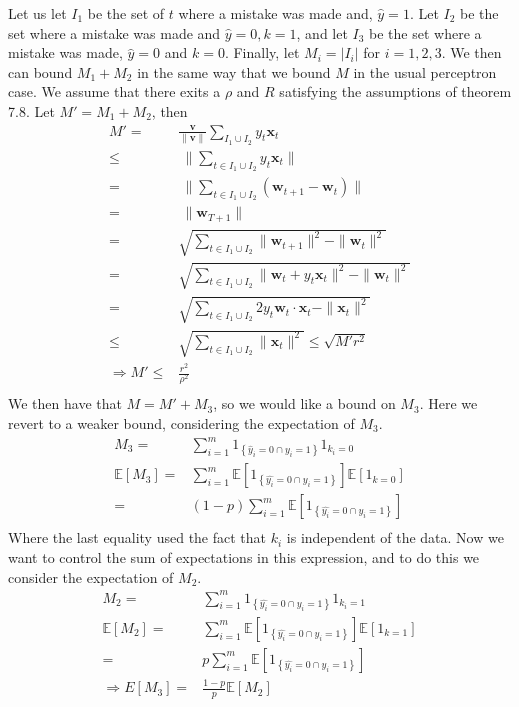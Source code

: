 \documentclass{article}
\newcommand{\V}[1]{\boldsymbol{#1}}
\newcommand{\E}[0]{\mathbb{E}}
\begin{document}
Let us let $I_1$ be the set of $t$ where a mistake was made and,
$\hat{y}=1$.  Let $I_2$ be the set where a mistake was made and
$\hat{y} = 0, k = 1$, and let $I_3$ be the set where a mistake was
made, $\hat{y} = 0$ and $k = 0$. Finally, let $M_i = |I_i|$ for $i =
1,2,3$. We then can bound $M_1 + M_2$ in the same way that we bound
$M$ in the usual perceptron case.  We assume that there exits a $\rho$
and $R$ satisfying the assumptions of theorem 7.8. Let $M' = M_1 + M_2$, then
\begin{align*}
M' =& \frac{\V{v}}{\|\V{v}\|}\sum_{I_1 \cup I_2}
y_t\V{x}_t \\
 \leq & \  \|\sum_{t \in I_1 \cup I_2} y_t \V{x}_t \|\\
= & \ \|\sum_{t \in I_1 \cup I_2} (\V{w}_{t+1} - \V{w}_t) \| \\
= & \ \|\V{w}_{T+1} \| \\
= & \sqrt{\sum_{t \in I_1 \cup I_2} \|  \V{w}_{t+1}\|^2 -
  \|\V{w}_t\|^2 }\\
= & \sqrt{\sum_{t \in I_1 \cup I_2} \|  \V{w}_{t} + y_t\V{x}_t\|^2 -
  \|\V{w}_t\|^2 }\\
= & \sqrt{\sum_{t \in I_1 \cup I_2} 2y_t\V{w}_t\cdot \V{x}_t -
  \|\V{x}_t\|^2} \\
\leq & \sqrt{\sum_{t \in I_1 \cup I_2} \|\V{x}_t\|^2} \leq
\sqrt{M'r^2} \\
\Rightarrow M' \leq &\frac{r^2}{\rho^2} \\
\end{align*}
We then have that $M = M' + M_3$, so we would like a bound on $M_3$.
Here we revert to a weaker bound, considering the expectation of
$M_3$.
\begin{align*}
M_3 =& \sum_{i=1}^m 1_{\left\{\hat{y}_i = 0 \cap y_i = 1\right\}}1_{k_i = 0} \\
\E[M_3] = & \sum_{i=1}^m \E[1_{\left\{\hat{y_i} = 0 \cap y_i = 1\right\}}]\E[1_{k = 0}] \\
 = & (1 - p)\sum_{i=1}^m \E[1_{\left\{\hat{y_i} = 0 \cap y_i = 1\right\}}]\\
\end{align*}
Where the last equality used the fact that $k_i$ is independent of the data.  Now we want to control the sum of expectations in this expression, and to do this we consider the expectation of $M_2$.
\begin{align*}
M_2 = & \sum_{i=1}^m 1_{\left\{\hat{y_i} = 0 \cap y_i = 1\right\}}1_{k_i = 1} \\
\E[M_2] = & \sum_{i=1}^m \E[1_{\left\{\hat{y_i} = 0 \cap y_i = 1\right\}}]\E[1_{k = 1}] \\
= & p\sum_{i=1}^m \E[1_{\left\{\hat{y_i} = 0 \cap y_i = 1\right\}}]\\
\Rightarrow E[M_3] = & \frac{1-p}{p}\E[M_2]
\end{align*}
\end{document}
